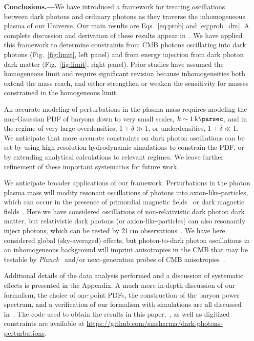 \documentclass[prd,aps,10pt,nofootinbib,twocolumn,superscriptaddress,preprintnumbers,balancelastpage,longbibliography]{revtex4-1}
\begin{document}
\noindent
{\bf Conclusions.---}We have introduced a framework for treating oscillations between dark photons and ordinary photons as they traverse the inhomogeneous plasma of our Universe.  Our main results are Eqs.~\eqref{eq:prob} and \eqref{eq:prob_dm}.  A complete discussion and derivation of these results appear in~.  We have applied this framework to determine constraints from CMB photons oscillating into dark photons (Fig.~\ref{fig:limit}, left panel) and from energy injection from dark photon dark matter (Fig.~\ref{fig:limit}, right panel).  Prior studies have assumed the homogeneous limit and require significant revision because inhomogeneities both extend the mass reach, and either strengthen or weaken the sensitivity for masses constrained in the homogeneous limit.

An accurate modeling of perturbations in the plasma mass requires modeling the non-Gaussian PDF of baryons down to very small scales, $k \sim \SI{1}{\kilo\parsec}$, and in the regime of very large overdensities, $1+\delta \gg1$, or underdensities, $1 + \delta \ll 1$.    We anticipate that more accurate constraints on dark photon oscillations can be set by using high resolution hydrodynamic simulations to constrain the PDF, or by extending analytical calculations to relevant regimes.  We leave further refinement of these important systematics for future work.

We anticipate broader applications of our framework.  Perturbations in the photon plasma mass will modify resonant oscillations of photons into axion-like-particles, which can occur in the presence of primordial magnetic fields~\cite{Mirizzi:2009nq} or dark magnetic fields~\cite{Choi:2019jwx}.  Here we have considered oscillations of non-relativistic dark photon dark matter, but relativistic dark photons (or axion-like-particles) can also resonantly inject photons, which can be tested by  21\,cm observations~\cite{Pospelov:2018kdh,Moroi:2018vci,Choi:2019jwx}.  We have here considered global (sky-averaged) effects, but photon-to-dark photon oscillations in an inhomogeneous background will imprint anisotropies in the CMB that may be testable by \emph{Planck}~\cite{Aghanim:2019ame} and/or next-generation probes of CMB anisotropies~\cite{Abazajian:2016yjj,Ade:2018sbj}.

Additional details of the data analysis performed and a discussion of systematic effects is presented in the Appendix. 
A much more in-depth discussion of our formalism, the choice of one-point PDFs, the construction of the baryon power spectrum, and a verification of our formalism with simulations are all discussed in~. 
The code used to obtain the results in this paper,~, as well as digitized constraints are available at \url{https://github.com/smsharma/dark-photons-perturbations}.
\end{document}
